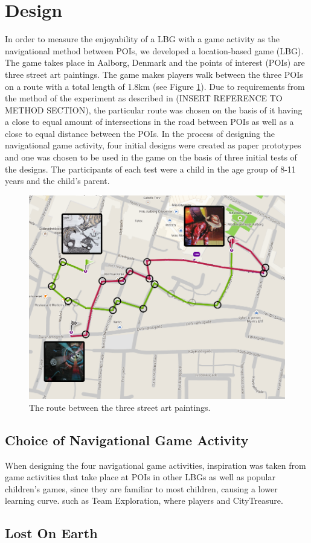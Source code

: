\section{Design}
In order to measure the enjoyability of a LBG with a game activity as the navigational method between POIs, we developed a location-based game (LBG). The game takes place in Aalborg, Denmark and the points of interest (POIs) are three street art paintings\cite{streetart}. The game makes players walk between the three POIs on a route with a total length of 1.8km (see Figure \ref{FinalRoute}). Due to requirements from the method of the experiment as described in (INSERT REFERENCE TO METHOD SECTION), the particular route was chosen on the basis of it having a close to equal amount of intersections in the road between POIs as well as a close to equal distance between the POIs. In the process of designing the navigational game activity, four initial designs were created as paper prototypes and one was chosen to be used in the game on the basis of three initial tests of the designs. The participants of each test were a child in the age group of 8-11 years and the child's parent.

\begin{figure}[hbtp]
\centering
\includegraphics[scale=0.3]{Pics/FinalRoute.png}
\caption{The route between the three street art paintings.}
\label{FinalRoute}
\end{figure}

\subsection{Choice of Navigational Game Activity}
When designing the four navigational game activities, inspiration was taken from game activities that take place at POIs in other LBGs as well as popular children's games, since they are familiar to most children, causing a lower learning curve.
such as Team Exploration\cite{GamingOnTheMove}, where players  and CityTreasure\cite{botturi2009city}. 

\subsection{Lost On Earth}
